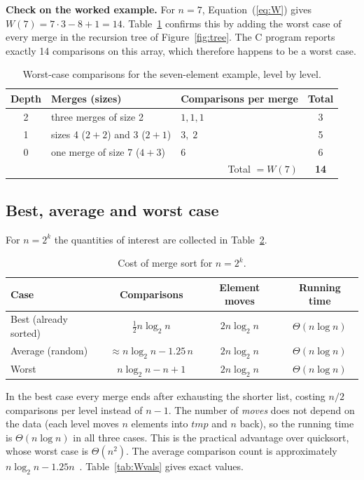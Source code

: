 \documentclass[11pt,a4paper]{article}
\theoremstyle{plain}
\theoremstyle{definition}
\renewcommand{\lg}{\log_2}
\begin{document}
\medskip\noindent\textbf{Check on the worked example.} For $n=7$, Equation~(\ref{eq:W}) gives $W(7)=7\cdot3-8+1=14$. Table~\ref{tab:n7} confirms this by adding the worst case of every merge in the recursion tree of Figure~\ref{fig:tree}. The C program reports exactly 14 comparisons on this array, which therefore happens to be a worst case.

\begin{table}[!ht]
\centering\small
\begin{tabular}{@{}cllc@{}}
\toprule
Depth & Merges (sizes) & Comparisons per merge & Total\\
\midrule
2 & three merges of size 2 & $1,1,1$ & 3\\
1 & sizes 4 ($2+2$) and 3 ($2+1$) & $3,\;2$ & 5\\
0 & one merge of size 7 ($4+3$) & $6$ & 6\\
\midrule
\multicolumn{3}{r}{Total $=W(7)$} & \textbf{14}\\
\bottomrule
\end{tabular}
\caption{Worst-case comparisons for the seven-element example, level by level.}
\label{tab:n7}
\end{table}

\subsection{Best, average and worst case}
For $n=2^k$ the quantities of interest are collected in Table~\ref{tab:cases}.
\begin{table}[!ht]
\centering\small
\begin{tabular}{@{}lccc@{}}
\toprule
Case & Comparisons & Element moves & Running time\\
\midrule
Best (already sorted) & $\tfrac12 n\lg n$ & $2n\lg n$ & $\Theta(n\log n)$\\
Average (random) & $\approx n\lg n-1.25\,n$ & $2n\lg n$ & $\Theta(n\log n)$\\
Worst & $n\lg n-n+1$ & $2n\lg n$ & $\Theta(n\log n)$\\
\bottomrule
\end{tabular}
\caption{Cost of merge sort for $n=2^k$.}
\label{tab:cases}
\end{table}
In the best case every merge ends after exhausting the shorter list, costing $n/2$ comparisons per level instead of $n-1$. The number of \emph{moves} does not depend on the data (each level moves $n$ elements into $tmp$ and $n$ back), so the running time is $\Theta(n\log n)$ in all three cases. This is the practical advantage over quicksort, whose worst case is $\Theta(n^2)$. The average comparison count is approximately $n\lg n-1.25n$~\cite{knuth3,flajolet}. Table~\ref{tab:Wvals} gives exact values.
\end{document}

